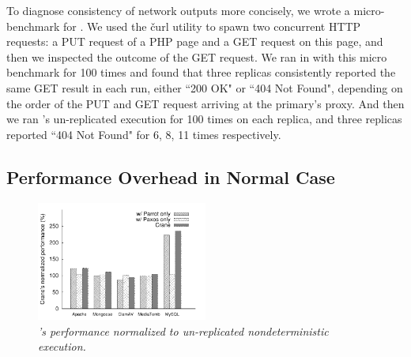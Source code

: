 To diagnose consistency of network outputs more concisely, we wrote a 
micro-benchmark for \apache. We used the \v{curl} utility to spawn two 
concurrent HTTP requests: a PUT request of a PHP page and a GET request on 
this page, and then we inspected the outcome of the GET request. We ran \apache 
in \xxx with this micro benchmark for 100 times and found that three replicas 
consistently reported the same GET result in each run, either ``200 OK" or 
``404 Not Found", depending on the order of the PUT and GET request arriving at 
the primary's proxy. And then we ran \apache's un-replicated 
execution for 100 times on each replica, and three replicas reported ``404 Not 
Found" for 6, 8, 11 times respectively.

\subsection{Performance Overhead in Normal Case} \label{sec:overhead}

\begin{figure}[t]
\centering
\includegraphics[width=0.5\textwidth]{figures/normalize-perf}
\vspace{-.10in}
\caption{\small {\em \xxx's performance normalized to un-replicated 
nondeterministic execution.}}
\label{fig:normalize-perf}
\end{figure}


